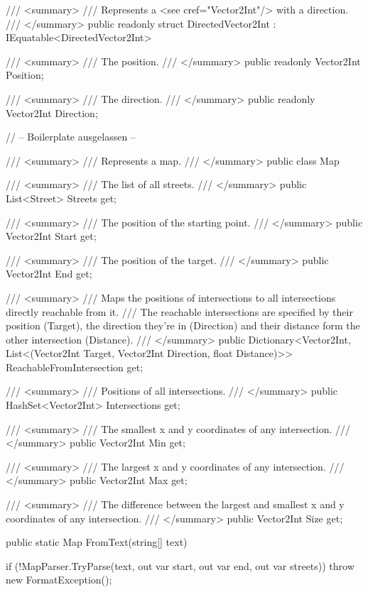 \documentclass{article}
\theoremstyle{nonumberplain}
\begin{document}
\begin{lstcs}[]
/// <summary>
/// Represents a <see cref="Vector2Int"/> with a direction.
/// </summary>
public readonly struct DirectedVector2Int : IEquatable<DirectedVector2Int>
{
    /// <summary>
    /// The position.
    /// </summary>
    public readonly Vector2Int Position;

    /// <summary>
    /// The direction.
    /// </summary>
    public readonly Vector2Int Direction;

    // -- Boilerplate ausgelassen --
}
\end{lstcs}

\begin{lstcs}[]
/// <summary>
/// Represents a map.
/// </summary>
public class Map
{
    /// <summary>
    /// The list of all streets.
    /// </summary>
    public List<Street> Streets { get; }

    /// <summary>
    /// The position of the starting point.
    /// </summary>
    public Vector2Int Start { get; }

    /// <summary>
    /// The position of the target.
    /// </summary>
    public Vector2Int End { get; }

    /// <summary>
    /// Maps the positions of intersections to all intersections directly reachable from it.
    /// The reachable intersections are specified by their position (Target), the direction they're in (Direction) and their distance form the other intersection (Distance).
    /// </summary>
    public Dictionary<Vector2Int, List<(Vector2Int Target, Vector2Int Direction, float Distance)>> ReachableFromIntersection { get; }

    /// <summary>
    /// Positions of all intersections.
    /// </summary>
    public HashSet<Vector2Int> Intersections { get; }

    /// <summary>
    /// The smallest x and y coordinates of any intersection.
    /// </summary>
    public Vector2Int Min { get; }

    /// <summary>
    /// The largest x and y coordinates of any intersection.
    /// </summary>
    public Vector2Int Max { get; }

    /// <summary>
    /// The difference between the largest and smallest x and y coordinates of any intersection.
    /// </summary>
    public Vector2Int Size { get; }

    public static Map FromText(string[] text)
    {
        if (!MapParser.TryParse(text, out var start, out var end, out var streets)) throw new FormatException();

}}
\end{lstcs}
\end{document}
